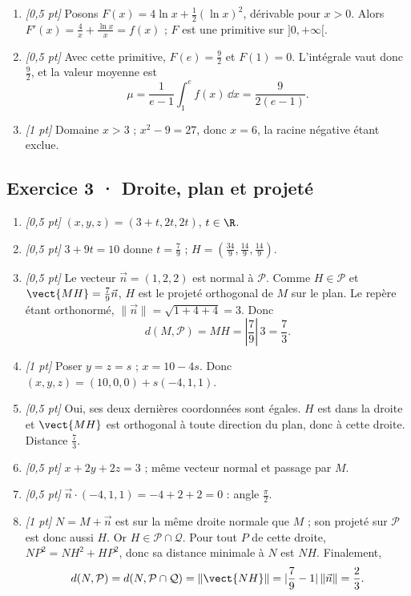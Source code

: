 \begin{enumerate}
\item \textit{[0{,}5 pt]} Posons $F(x)=4\ln x+\frac12(\ln x)^2$, dérivable pour $x>0$. Alors $F'(x)=\frac{4}{x}+\frac{\ln x}{x}=f(x)$ ; $F$ est une primitive sur $]0,+\infty[$.

\item \textit{[0{,}5 pt]} Avec cette primitive, $F(e)=\frac{9}{2}$ et $F(1)=0$. L'intégrale vaut donc $\frac{9}{2}$, et la valeur moyenne est
\[\mu=\frac{1}{e-1}\int_1^e f(x)\,\dd x=\frac{9}{2(e-1)}.\]

\item \textit{[1 pt]} Domaine $x>3$ ; $x^2-9=27$, donc $x=6$, la racine négative étant exclue.

\end{enumerate}

\subsection*{Exercice 3 · Droite, plan et projeté}\begin{enumerate}

\item \textit{[0{,}5 pt]} $(x,y,z)=(3+t,2t,2t)$, $t\in\R$.

\item \textit{[0{,}5 pt]} $3+9t=10$ donne $t=\frac{7}{9}$ ; $H=(\frac{34}{9},\frac{14}{9},\frac{14}{9})$.

\item \textit{[0{,}5 pt]} Le vecteur $\vec n=(1,2,2)$ est normal à $\mathcal P$. Comme $H\in\mathcal P$ et $\vect{MH}=\frac{7}{9}\vec n$, $H$ est le projeté orthogonal de $M$ sur le plan. Le repère étant orthonormé, $\|\vec n\|=\sqrt{1+4+4}=3$. Donc
\[d(M,\mathcal P)=MH=|\frac{7}{9}|\,3=\frac{7}{3}.\]

\item \textit{[1 pt]} Poser $y=z=s$ ; $x=10-4s$. Donc $(x,y,z)=(10,0,0)+s(-4,1,1)$.

\item \textit{[0{,}5 pt]} Oui, ses deux dernières coordonnées sont égales. $H$ est dans la droite et $\vect{MH}$ est orthogonal à toute direction du plan, donc à cette droite. Distance $\frac{7}{3}$.

\item \textit{[0{,}5 pt]} $x+2y+2z=3$ ; même vecteur normal et passage par $M$.

\item \textit{[0{,}5 pt]} $\vec n\cdot(-4,1,1)=-4+2+2=0$ : angle $\frac{\pi}{2}$.

\item \textit{[1 pt]} $N=M+\vec n$ est sur la même droite normale que $M$ ; son projeté sur $\mathcal P$ est donc aussi $H$. Or $H\in\mathcal P\cap\mathcal Q$. Pour tout $P$ de cette droite, $NP^2=NH^2+HP^2$, donc sa distance minimale à $N$ est $NH$. Finalement,
\[d(N,\mathcal P)=d(N,\mathcal P\cap\mathcal Q)=\|\vect{NH}\|=|\frac{7}{9}-1|\,\|\vec n\|=\frac{2}{3}.\]

\end{enumerate}


